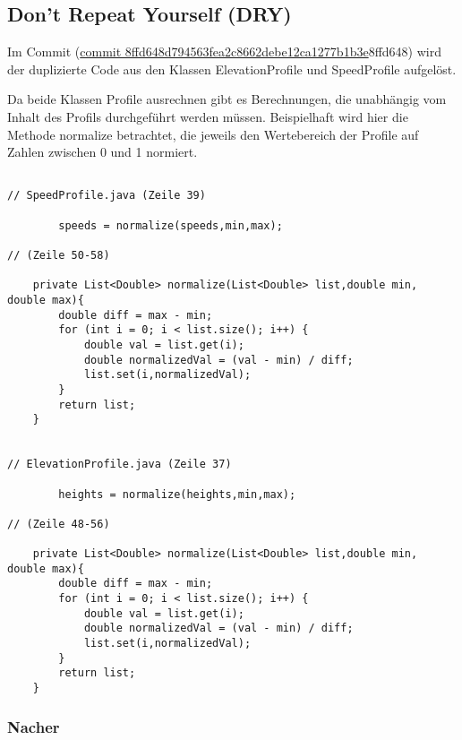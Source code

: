 \subsection{Don’t Repeat Yourself (DRY)}

Im Commit (\href{https://github.com/reichert-p/GPXrechner/commit/8ffd648d794563fea2c8662debe12ca1277b1b3e#diff-3be7b5bf425b2c9794272cdc879a4e9b0ed23bab55acbdf71756fbda1356ff80}{commit 8ffd648d794563fea2c8662debe12ca1277b1b3e}{8ffd648}) wird der duplizierte Code aus den Klassen ElevationProfile und SpeedProfile aufgelöst.

Da beide Klassen Profile ausrechnen gibt es Berechnungen, die unabhängig vom Inhalt des Profils durchgeführt werden müssen. Beispielhaft wird hier die Methode normalize betrachtet, die jeweils den Wertebereich der Profile auf Zahlen zwischen 0 und 1 normiert. 


\begin{lstlisting}[caption={Sich wiederholender Code vor dem Commit}]

// SpeedProfile.java (Zeile 39)

		speeds = normalize(speeds,min,max);
		
// (Zeile 50-58)

    private List<Double> normalize(List<Double> list,double min, double max){
        double diff = max - min;
        for (int i = 0; i < list.size(); i++) {
            double val = list.get(i);
            double normalizedVal = (val - min) / diff;
            list.set(i,normalizedVal);
        }
        return list;
	}
    

// ElevationProfile.java (Zeile 37)

		heights = normalize(heights,min,max);
		
// (Zeile 48-56)

    private List<Double> normalize(List<Double> list,double min, double max){
        double diff = max - min;
        for (int i = 0; i < list.size(); i++) {
            double val = list.get(i);
            double normalizedVal = (val - min) / diff;
            list.set(i,normalizedVal);
        }
        return list;
    }

\end{lstlisting}



\subsubsection{Nacher}

